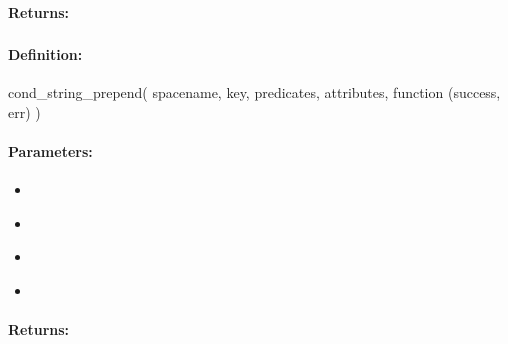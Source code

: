 \paragraph{Returns:}


\pagebreak
\subsubsection{}
\label{api:nodejs:cond_string_prepend}


\paragraph{Definition:}
\begin{javascriptcode}
cond_string_prepend(
        spacename, key, predicates, attributes, function (success, err) {})
\end{javascriptcode}
\paragraph{Parameters:}
\begin{itemize}[noitemsep]
\item {}\\

\item {}\\

\item {}\\

\item {}\\

\end{itemize}

\paragraph{Returns:}


\pagebreak
\subsubsection{}
\label{api:nodejs:group_string_prepend}


